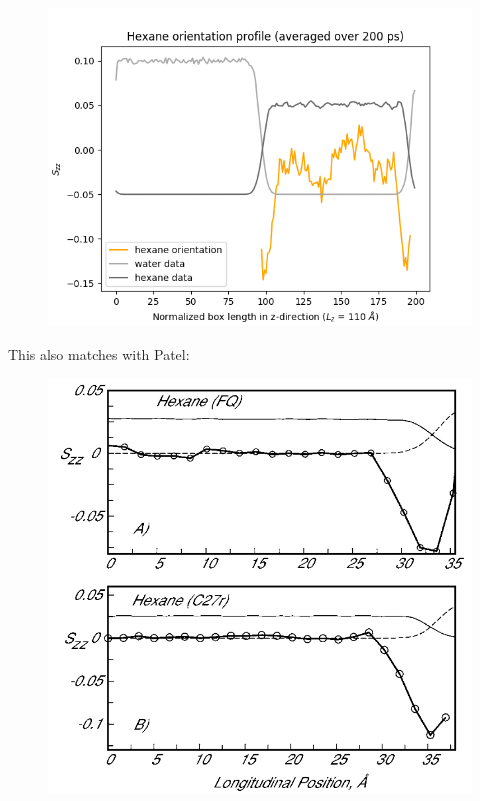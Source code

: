 \documentclass[12pt,reqno]{amsart}
\numberwithin{equation}{section}
\begin{document}
\begin{enumerate}
\begin{figure}[H]
\centering
\includegraphics[scale=0.4]{orientation_hexane}
\end{figure}

This also matches with Patel:

\begin{figure}[H]
\centering
\includegraphics[scale=0.4]{patel_hexane_orientation}
\end{figure}



\end{enumerate}
\end{document}
